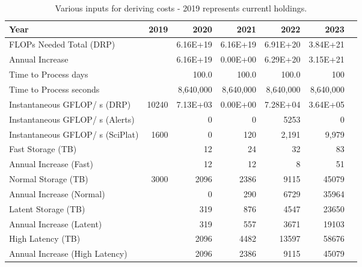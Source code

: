 \tiny \begin{longtable} { |p{}  |r  |r  |r  |r  |r  |r |} 
\caption{Various inputs for deriving costs - 2019 represents currentl holdings. \label{tab:Inputs}}\\ 
\hline 
\textbf{Year}&\textbf{2019}&\textbf{2020}&\textbf{2021}&\textbf{2022}&\textbf{2023} \\ \hline
{FLOPs Needed Total (DRP)}&{}&{6.16E+19}&{6.16E+19}&{6.91E+20}&{3.84E+21} \\ \hline
{Annual Increase}&{}&{6.16E+19}&{0.00E+00}&{6.29E+20}&{3.15E+21} \\ \hline
{Time to Process days}&{}&{100.0}&{100.0}&{100.0}&{100} \\ \hline
{Time to Process seconds}&{}&{8,640,000}&{8,640,000}&{8,640,000}&{8,640,000} \\ \hline
{Instantaneous GFLOP/ s (DRP)}&{10240}&{7.13E+03}&{0.00E+00}&{7.28E+04}&{3.64E+05} \\ \hline
{Instantaneous GFLOP/ s (Alerts)}&{}&{0}&{0}&{5253}&{0} \\ \hline
{Instantaneous GFLOP/ s (SciPlat)}&{1600}&{0}&{120}&{2,191}&{9,979} \\ \hline
{Fast Storage (TB)}&{}&{12}&{24}&{32}&{83} \\ \hline
{Annual Increase (Fast)}&{}&{12}&{12}&{8}&{51} \\ \hline
{Normal Storage (TB)}&{3000}&{2096}&{2386}&{9115}&{45079} \\ \hline
{Annual Increase (Normal)}&{}&{0}&{290}&{6729}&{35964} \\ \hline
{Latent Storage  (TB)}&{}&{319}&{876}&{4547}&{23650} \\ \hline
{Annual Increase (Latent)}&{}&{319}&{557}&{3671}&{19103} \\ \hline
{High Latency (TB)}&{}&{2096}&{4482}&{13597}&{58676} \\ \hline
{Annual Increase (High Latency)}&{}&{2096}&{2386}&{9115}&{45079} \\ \hline
\end{longtable} \normalsize
